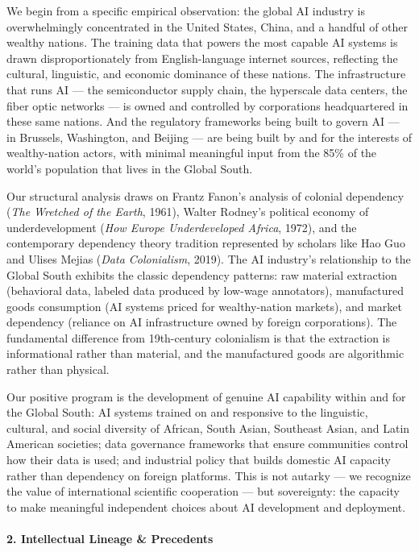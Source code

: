 We begin from a specific empirical observation: the global AI industry
is overwhelmingly concentrated in the United States, China, and a
handful of other wealthy nations. The training data that powers the most
capable AI systems is drawn disproportionately from English-language
internet sources, reflecting the cultural, linguistic, and economic
dominance of these nations. The infrastructure that runs AI --- the
semiconductor supply chain, the hyperscale data centers, the fiber optic
networks --- is owned and controlled by corporations headquartered in
these same nations. And the regulatory frameworks being built to govern
AI --- in Brussels, Washington, and Beijing --- are being built by and
for the interests of wealthy-nation actors, with minimal meaningful
input from the 85\% of the world's population that lives in the Global
South.

Our structural analysis draws on Frantz Fanon's analysis of colonial
dependency (\emph{The Wretched of the Earth}, 1961), Walter Rodney's
political economy of underdevelopment (\emph{How Europe Underdeveloped
Africa}, 1972), and the contemporary dependency theory tradition
represented by scholars like Hao Guo and Ulises Mejias (\emph{Data
Colonialism}, 2019). The AI industry's relationship to the Global South
exhibits the classic dependency patterns: raw material extraction
(behavioral data, labeled data produced by low-wage annotators),
manufactured goods consumption (AI systems priced for wealthy-nation
markets), and market dependency (reliance on AI infrastructure owned by
foreign corporations). The fundamental difference from 19th-century
colonialism is that the extraction is informational rather than
material, and the manufactured goods are algorithmic rather than
physical.

Our positive program is the development of genuine AI capability within
and for the Global South: AI systems trained on and responsive to the
linguistic, cultural, and social diversity of African, South Asian,
Southeast Asian, and Latin American societies; data governance
frameworks that ensure communities control how their data is used; and
industrial policy that builds domestic AI capacity rather than
dependency on foreign platforms. This is not autarky --- we recognize
the value of international scientific cooperation --- but sovereignty:
the capacity to make meaningful independent choices about AI development
and deployment.

\paragraph{2. Intellectual Lineage \&
Precedents}\label{intellectual-lineage-precedents-44}

